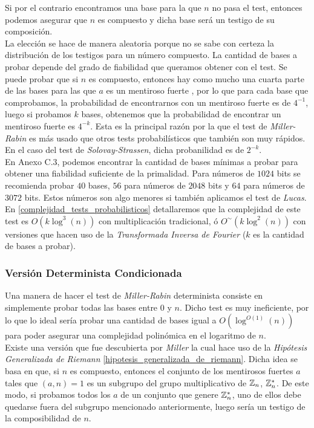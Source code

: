 Si por el contrario encontramos una base para la que $n$ no pasa el test, entonces podemos asegurar que $n$ es compuesto y dicha base será un testigo de su composición.\\

La elección se hace de manera aleatoria porque no se sabe con certeza la distribución de los testigos para un número compuesto. La cantidad de bases a probar depende del grado de fiabilidad que queramos obtener con el test. Se puede probar que si $n$ es compuesto, entonces hay como mucho una cuarta parte de las bases para las que $a$ es un mentiroso fuerte \cite{rabin_1980}, por lo que para cada base que comprobamos, la probabilidad de encontrarnos con un mentiroso fuerte es de $4^{-1}$, luego si probamos $k$ bases, obtenemos que la probabilidad de encontrar un mentiroso fuerte es $4^{-k}$. Esta es la principal razón por la que el test de \textit{Miller-Rabin} es más usado que otros tests probabilísticos que también son muy rápidos. En el caso del test de \textit{Solovay-Strassen}, dicha probanilidad es de $2^{-k}$.\\

En \cite{digital_signature_standard} Anexo C.3, podemos encontrar la cantidad de bases mínimas a probar para obtener una fiabilidad suficiente de la primalidad. Para números de $1024$ bits se recomienda probar $40$ bases, $56$ para números de $2048$ bits y $64$ para números de $3072$ bits. Estos números son algo menores si también aplicamos el test de \textit{Lucas}.\\

En \autoref{complejidad_tests_probabilisticos} detallaremos que la complejidad de este test es $O(k\log^3(n))$ con multiplicación tradicional, ó $O^\sim(k\log^2(n))$ con versiones que hacen uso de la \textit{Transformada Inversa de Fourier} ($k$ es la cantidad de bases a probar).

\subsubsection{Versión Determinista Condicionada}

Una manera de hacer el test de \textit{Miller-Rabin} determinista consiste en simplemente probar todas las bases entre $0$ y $n$. Dicho test es muy ineficiente, por lo que lo ideal sería probar una cantidad de bases igual a $O(\log^{O(1)}(n))$ para poder asegurar una complejidad polinómica en el logaritmo de $n$.\\

Existe una versión que fue descubierta por \textit{Miller} la cual hace uso de la \textit{Hipótesis Generalizada de Riemann} \ref{hipotesis_generalizada_de_riemann}. Dicha idea se basa en que, si $n$ es compuesto, entonces el conjunto de los mentirosos fuertes $a$ tales que $(a, n) = 1$ es un subgrupo del grupo multiplicativo de $\mathbb{Z}_n$, $\mathbb{Z}_n^*$. De este modo, si probamos todos los $a$ de un conjunto que genere $\mathbb{Z}_n^*$, uno de ellos debe quedarse fuera del subgrupo mencionado anteriormente, luego sería un testigo de la composibilidad de $n$.\\

